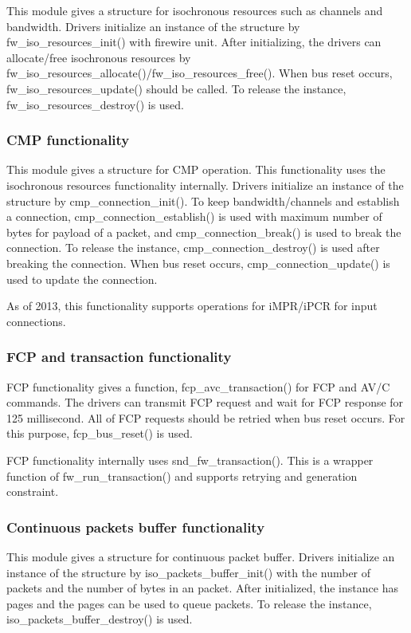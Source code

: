 \documentclass[onecolumn]{article}
\begin{document}
This module gives a structure for isochronous resources such as channels and bandwidth. Drivers initialize an instance of the structure by fw\_iso\_resources\_init() with firewire unit. After initializing, the drivers can allocate/free isochronous resources by fw\_iso\_resources\_allocate()/fw\_iso\_resources\_free(). When bus reset occurs, fw\_iso\_resources\_update() should be called. To release the instance, fw\_iso\_resources\_destroy() is used.

\subsubsection{CMP functionality}

This module gives a structure for CMP operation. This functionality uses the isochronous resources functionality internally. Drivers initialize an instance of the structure by cmp\_connection\_init(). To keep bandwidth/channels and establish a connection, cmp\_connection\_establish() is used with maximum number of bytes for payload of a packet, and cmp\_connection\_break() is used to break the connection. To release the instance, cmp\_connection\_destroy() is used after breaking the connection. When bus reset occurs, cmp\_connection\_update() is used to update the connection.

As of 2013, this functionality supports operations for iMPR/iPCR for input connections.

\subsubsection{FCP and transaction functionality}

FCP functionality gives a function, fcp\_avc\_transaction() for FCP and AV/C commands. The drivers can transmit FCP request and wait for FCP response for 125 millisecond. All of FCP requests should be retried when bus reset occurs. For this purpose, fcp\_bus\_reset() is used.

FCP functionality internally uses snd\_fw\_transaction(). This is a wrapper function of fw\_run\_transaction() and supports retrying and generation constraint.


\subsubsection{Continuous packets buffer functionality}

This module gives a structure for continuous packet buffer. Drivers initialize an instance of the structure by iso\_packets\_buffer\_init() with the number of packets and the number of bytes in an packet. After initialized, the instance has pages and the pages can be used to queue packets. To release the instance, iso\_packets\_buffer\_destroy() is used.
\end{document}
